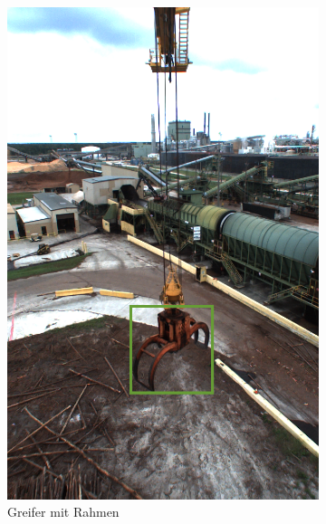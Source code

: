 		\begin{figure}[h]
		\centering
		\begin{subfigure}[c]{0.49\textwidth}			
			\includegraphics[width=1\textwidth, center]{bilder/Grundlagen/Grapple_8.png}
			\caption[Bsp. Bild: Greifer mit Rahmen]{Greifer mit Rahmen}
			\label{img:Grapple}	
		\end{subfigure}
		\begin{subfigure}[c]{0.49\textwidth}			

\end{subfigure}
\end{figure}
